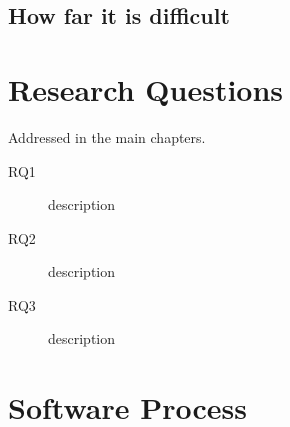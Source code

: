 \subsection{How far it is difficult}

\section{Research Questions}
\label{sec:ch2-research-questions}

Addressed in the main chapters.

\begin{description}
	\item[RQ1] description
	\item[RQ2] description
	\item[RQ3] description
\end{description}


\section{Software Process}
\label{sec:ch2-software-process}
